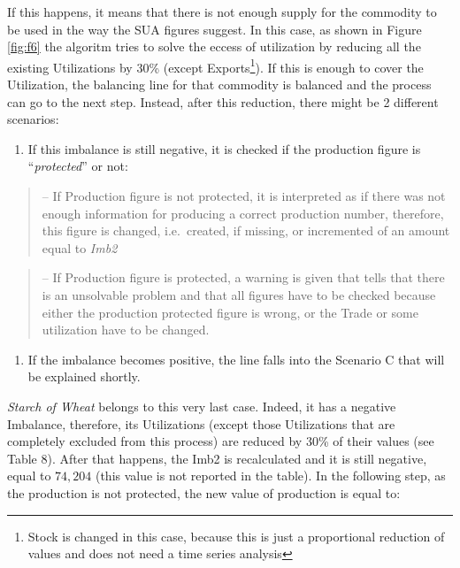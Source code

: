 \documentclass[]{article}
\providecommand{\tightlist}{%
  \setlength{\itemsep}{0pt}\setlength{\parskip}{0pt}}
\let\rmarkdownfootnote\footnote%
\def\footnote{\protect\rmarkdownfootnote}
\begin{document}
If this happens, it means that there is not enough supply for the
commodity to be used in the way the SUA figures suggest. In this case,
as shown in Figure \ref{fig:f6} the algoritm tries to solve the eccess
of utilization by reducing all the existing Utilizations by 30\% (except
Exports\footnote{Stock is changed in this case, because this is just a
  proportional reduction of values and does not need a time series
  analysis}). If this is enough to cover the Utilization, the balancing
line for that commodity is balanced and the process can go to the next
step. Instead, after this reduction, there might be 2 different
scenarios:

\begin{enumerate}
\def\labelenumi{\arabic{enumi}.}
\tightlist
\item
  If this imbalance is still negative, it is checked if the production
  figure is ``\emph{protected}'' or not:
\end{enumerate}

\begin{quote}
-- If Production figure is not protected, it is interpreted as if there
was not enough information for producing a correct production number,
therefore, this figure is changed, i.e.~created, if missing, or
incremented of an amount equal to \emph{Imb2}
\end{quote}

\begin{quote}
-- If Production figure is protected, a warning is given that tells that
there is an unsolvable problem and that all figures have to be checked
because either the production protected figure is wrong, or the Trade or
some utilization have to be changed.
\end{quote}

\begin{enumerate}
\def\labelenumi{\arabic{enumi}.}
\setcounter{enumi}{1}
\tightlist
\item
  If the imbalance becomes positive, the line falls into the Scenario C
  that will be explained shortly.
\end{enumerate}

\emph{Starch of Wheat} belongs to this very last case. Indeed, it has a
negative Imbalance, therefore, its Utilizations (except those
Utilizations that are completely excluded from this process) are reduced
by 30\% of their values (see Table 8). After that happens, the Imb2 is
recalculated and it is still negative, equal to \(74,204\) (this value
is not reported in the table). In the following step, as the production
is not protected, the new value of production is equal to:
\end{document}
